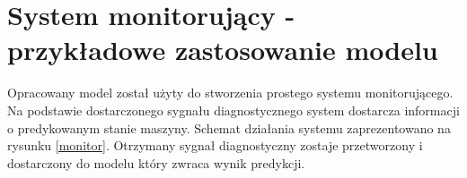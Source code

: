 \documentclass[inzynierska]{pwr_wmat_praca_dyplomowa}
\theoremstyle{plain}
\numberwithin{theorem}{chapter}
\theoremstyle{definition}
\numberwithin{theorem}{chapter}
\begin{document}




\chapter{System monitorujący - przykładowe zastosowanie modelu}
Opracowany model został użyty do stworzenia prostego systemu monitorującego. Na podstawie dostarczonego sygnału diagnostycznego system dostarcza informacji o predykowanym stanie maszyny. Schemat działania systemu zaprezentowano na rysunku \ref{monitor}. Otrzymany sygnał diagnostyczny zostaje przetworzony i dostarczony do modelu który zwraca wynik predykcji.
 
\end{document}
